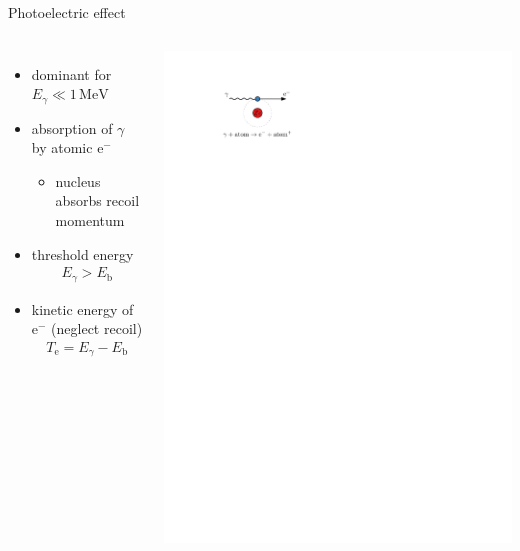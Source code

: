 \documentclass[11pt,xcolor=dvipsnames,professionalfonts,notes]{beamer}
\begin{document}
\begin{frame}{Photoelectric effect}
	\begin{columns}
		\begin{itemize}
			\setlength\itemsep{1.5em}
			\item dominant for $E_\gamma \ll 1 \, \mathrm{MeV}$
			
			\item absorption of $\gamma$ by atomic $\mathrm{e}^-$
			\begin{itemize}
				\item nucleus absorbs recoil momentum
			\end{itemize}
			
			\item threshold energy
			\begin{align*}
				E_\gamma > E_\mathrm{b}
			\end{align*}

			\item kinetic energy of $\mathrm{e}^-$ (neglect recoil)
			\begin{align*}
				T_\mathrm{e} = E_\gamma - E_\mathrm{b}
			\end{align*}
		\end{itemize}
		
		\begin{center}
			\includegraphics{./figures/photoeffect_detail.pdf}
		\end{center}
	\end{columns}
\end{frame}
\end{document}
